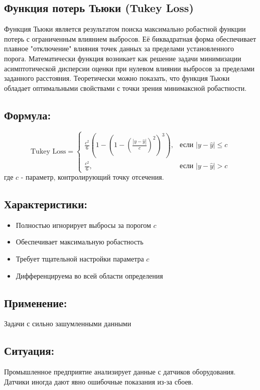 \documentclass[12pt]{article}
\theoremstyle{definition}
\theoremstyle{definition}
\theoremstyle{definition}
\theoremstyle{remark}
\theoremstyle{remark}
\begin{document}
\subsection{Функция потерь Тьюки (Tukey Loss)}

Функция Тьюки является результатом поиска максимально робастной функции потерь с ограниченным влиянием выбросов. Её биквадратная форма обеспечивает плавное "отключение" влияния точек данных за пределами установленного порога. Математически функция возникает как решение задачи минимизации асимптотической дисперсии оценки при нулевом влиянии выбросов за пределами заданного расстояния. Теоретически можно показать, что функция Тьюки обладает оптимальными свойствами с точки зрения минимаксной робастности.

\subsection*{Формула:}
\[
\text{Tukey Loss} =
\begin{cases}
\frac{c^2}{6} \left(1 - \left(1 - \left(\frac{|y - \hat{y}|}{c}\right)^2\right)^3\right), & \text{если } |y - \hat{y}| \leq c \\
\frac{c^2}{6}, & \text{если } |y - \hat{y}| > c
\end{cases}
\]
где $c$ - параметр, контролирующий точку отсечения.

\subsection*{Характеристики:}
\begin{itemize}
    \item Полностью игнорирует выбросы за порогом $c$
    \item Обеспечивает максимальную робастность
    \item Требует тщательной настройки параметра $c$
    \item Дифференцируема во всей области определения
\end{itemize}

\subsection*{Применение:} Задачи с сильно зашумленными данными

\subsection*{Ситуация:} Промышленное предприятие анализирует данные с датчиков оборудования. Датчики иногда дают явно ошибочные показания из-за сбоев.
\end{document}
